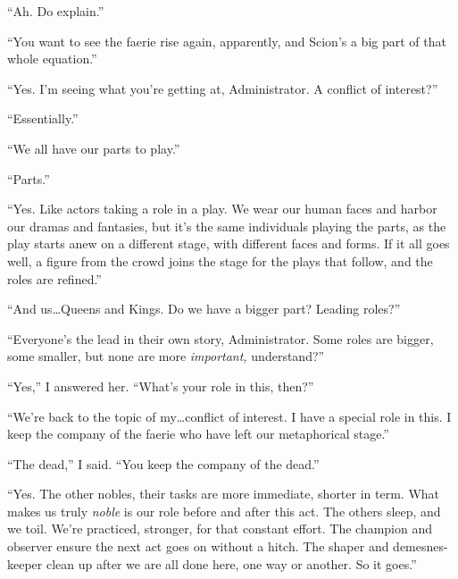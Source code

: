 ``Ah.  Do explain.''



``You want to see the faerie rise again, apparently, and Scion's a big part of that whole equation.''



``Yes.  I'm seeing what you're getting at, Administrator.  A conflict of interest?''



``Essentially.''



``We all have our parts to play.''



``Parts.''



``Yes.  Like actors taking a role in a play.  We wear our human faces and harbor our dramas and fantasies, but it's the same individuals playing the parts, as the play starts anew on a different stage, with different faces and forms.  If it all goes well, a figure from the crowd joins the stage for the plays that follow, and the roles are refined.''



``And us\ldots Queens and Kings.  Do we have a bigger part?  Leading roles?''



``Everyone's the lead in their own story, Administrator.  Some roles are bigger, some smaller, but none are more \emph{important, }understand?''



``Yes,'' I answered her.  ``What's your role in this, then?''



``We're back to the topic of my\ldots conflict of interest.  I have a special role in this.  I keep the company of the faerie who have left our metaphorical stage.''



``The dead,'' I said.  ``You keep the company of the dead.''



``Yes.  The other nobles, their tasks are more immediate, shorter in term.  What makes us truly \emph{noble} is our role before and after this act.  The others sleep, and we toil.  We're practiced, stronger, for that constant effort.  The champion and observer ensure the next act goes on without a hitch.  The shaper and demesnes-keeper clean up after we are all done here, one way or another.  So it goes.''



